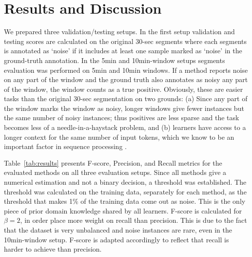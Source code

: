 \documentclass[runningheads]{llncs}
\begin{document}
\section{Results and Discussion}
\label{sec:results}

We prepared three validation/testing setups. In the first setup
validation and testing scores are calculated on the original 30-sec
segments where each segments is annotated as `noise' if it includes at
least one sample marked as `noise' in the ground-truth annotation.
In the 5min and 10min-window setups segments evaluation was performed
on 5min and 10min windows. If a method reports noise on any part of
the window and the ground truth also annotates as noisy any part of the
window, the window counts as a true positive. Obviously, these are
easier tasks than the original 30-sec segmentation on two
grounds:
(a) Since any part of the window marks the window as noisy, longer
windows give fewer instances but the same number of noisy instances;
thus positives are less sparse and the task becomes less of a
needle-in-a-haystack problem, and (b) learners have access to a longer
context for the same number of input tokens, which we know to be an
important factor in sequence processing \cite{Lee_2021}.



Table~\ref{tab:results} presents F-score, Precision, and Recall
metrics for the evaluated methods on all three evaluation setups.
%
Since all methods give a numerical estimation and not a binary
decision, a threshold was established. The threshold was calculated
on the training data, separately for each method,
as the threshold that makes 1\% of the training data come out
as noise. This is the only piece of prior domain knowledge shared by
all learners.
%
F-score is calculated for $\beta=2$, in order place
more weight on recall than precision. This is due to the fact that
the dataset is very unbalanced and noise instances are rare, even in
the 10min-window setup. F-score is adapted accordingly to reflect
that recall is harder to achieve than precision.

\end{document}
